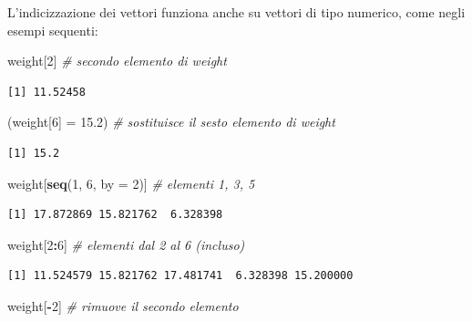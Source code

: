 \documentclass[
  a4paper,
  DIV=11,
  numbers=noendperiod]{scrreprt}
\newenvironment{Shaded}{\begin{snugshade}}{\end{snugshade}}
\newcommand{\AttributeTok}[1]{\textcolor[rgb]{0.13,0.29,0.53}{#1}}
\newcommand{\CommentTok}[1]{\textcolor[rgb]{0.56,0.35,0.01}{\textit{#1}}}
\newcommand{\DecValTok}[1]{\textcolor[rgb]{0.00,0.00,0.81}{#1}}
\newcommand{\FloatTok}[1]{\textcolor[rgb]{0.00,0.00,0.81}{#1}}
\newcommand{\FunctionTok}[1]{\textcolor[rgb]{0.13,0.29,0.53}{\textbf{#1}}}
\newcommand{\NormalTok}[1]{#1}
\newcommand{\OtherTok}[1]{\textcolor[rgb]{0.56,0.35,0.01}{#1}}
\newcommand{\SpecialCharTok}[1]{\textcolor[rgb]{0.81,0.36,0.00}{\textbf{#1}}}
\begin{document}
L'indicizzazione dei vettori funziona anche su vettori di tipo numerico,
come negli esempi sequenti:

\begin{Shaded}
\begin{Highlighting}[]
\NormalTok{weight[}\DecValTok{2}\NormalTok{] }\CommentTok{\# secondo elemento di weight}
\end{Highlighting}
\end{Shaded}

\begin{verbatim}
[1] 11.52458
\end{verbatim}

\begin{Shaded}
\begin{Highlighting}[]
\NormalTok{(weight[}\DecValTok{6}\NormalTok{] }\OtherTok{=} \FloatTok{15.2}\NormalTok{) }\CommentTok{\# sostituisce il sesto elemento di weight}
\end{Highlighting}
\end{Shaded}

\begin{verbatim}
[1] 15.2
\end{verbatim}

\begin{Shaded}
\begin{Highlighting}[]
\NormalTok{weight[}\FunctionTok{seq}\NormalTok{(}\DecValTok{1}\NormalTok{, }\DecValTok{6}\NormalTok{, }\AttributeTok{by =} \DecValTok{2}\NormalTok{)] }\CommentTok{\# elementi 1, 3, 5}
\end{Highlighting}
\end{Shaded}

\begin{verbatim}
[1] 17.872869 15.821762  6.328398
\end{verbatim}

\begin{Shaded}
\begin{Highlighting}[]
\NormalTok{weight[}\DecValTok{2}\SpecialCharTok{:}\DecValTok{6}\NormalTok{] }\CommentTok{\# elementi dal 2 al 6 (incluso)}
\end{Highlighting}
\end{Shaded}

\begin{verbatim}
[1] 11.524579 15.821762 17.481741  6.328398 15.200000
\end{verbatim}

\begin{Shaded}
\begin{Highlighting}[]
\NormalTok{weight[}\SpecialCharTok{{-}}\DecValTok{2}\NormalTok{] }\CommentTok{\# rimuove il secondo elemento}
\end{Highlighting}
\end{Shaded}
\end{document}
